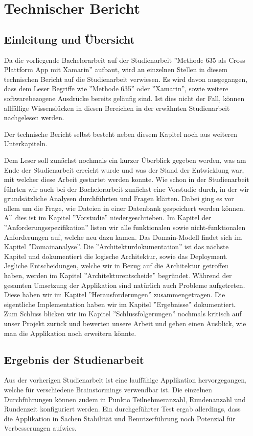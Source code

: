 \section{Technischer Bericht}

\subsection{Einleitung und Übersicht}
Da die vorliegende Bachelorarbeit auf der Studienarbeit ''Methode 635 als Cross Plattform App mit Xamarin'' \cite{methode635-sa} aufbaut, wird an einzelnen Stellen in diesem technischen Bericht auf die Studienarbeit verwiesen. Es wird davon ausgegangen, dass dem Leser Begriffe wie ''Methode 635'' oder ''Xamarin'', sowie weitere softwarebezogene Ausdrücke bereits geläufig sind. Ist dies nicht der Fall, können allfällige Wissenslücken in diesen Bereichen in der erwähnten Studienarbeit nachgelesen werden.

Der technische Bericht selbst besteht neben diesem Kapitel noch aus weiteren Unterkapiteln. 

Dem Leser soll zunächst nochmals ein kurzer Überblick gegeben werden, was am Ende der Studienarbeit erreicht wurde und was der Stand der Entwicklung war, mit welcher diese Arbeit gestartet werden konnte. Wie schon in der Studienarbeit führten wir auch bei der Bachelorarbeit zunächst eine Vorstudie durch, in der wir grundsätzliche Analysen durchführten und Fragen klärten. Dabei ging es vor allem um die Frage, wie Dateien in einer Datenbank gespeichert werden können. All dies ist im Kapitel ''Vorstudie'' niedergeschrieben. Im Kapitel der ''Anforderungsspezifikation'' listen wir alle funktionalen sowie nicht-funktionalen Anforderungen auf, welche neu dazu kamen. Das Domain-Modell findet sich im Kapitel ''Domainanalyse''. Die ''Architektur\-dokumentation'' ist das nächste Kapitel und dokumentiert die logische Architektur, sowie das Deployment. Jegliche Entscheidungen, welche wir in Bezug auf die Architektur getroffen haben, werden im Kapitel ''Architekturentscheide'' begründet. Während der gesamten Umsetzung der Applikation sind natürlich auch Probleme aufgetreten. Diese haben wir im Kapitel ''Herausforderungen'' zusammengetragen. Die eigentliche Implementation haben wir im Kapitel ''Ergebnisse'' dokumentiert. Zum Schluss blicken wir im Kapitel ''Schlussfolgerungen'' nochmals kritisch auf unser Projekt zurück und bewerten unsere Arbeit und geben einen Ausblick, wie man die Applikation noch erweitern könnte.

\subsection{Ergebnis der Studienarbeit}
Aus der vorherigen Studienarbeit ist eine lauffähige Applikation hervorgegangen, welche für verschiedene Brainstormings verwendbar ist. Die einzelnen Durchführungen können zudem in Punkto Teilnehmeranzahl, Rundenanzahl und Rundenzeit konfiguriert werden. Ein durchgeführter Test ergab allerdings, dass die Applikation in Sachen Stabilität und Benutzerführung noch Potenzial für Verbesserungen aufwies.

